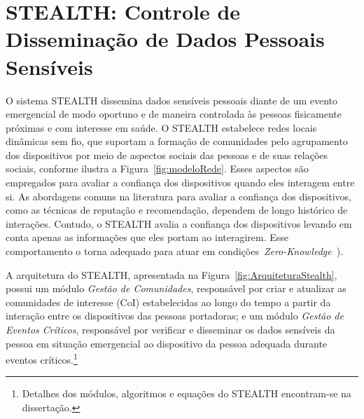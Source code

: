 \documentclass[12pt]{article}
\newcommand{\as}[1]{\textcolor{blue}{{\bf #1}}}
\newcommand{\al}[1]{\textcolor{brown}{{\bf #1}}}
\begin{document}
\vspace{-0.2cm}

\section{STEALTH: Controle de Disseminação de Dados Pessoais Sensíveis}
\label{sec:sistema}

O sistema \mbox{STEALTH} dissemina dados sensíveis pessoais diante de um evento emergencial de modo oportuno e de maneira controlada às pessoas fisicamente próximas e com interesse em saúde. 
O \mbox{STEALTH}
estabelece redes locais dinâmicas sem fio, que suportam a formação de comunidades pelo agrupamento dos dispositivos por meio de aspectos sociais das pessoas e de suas relações sociais,
conforme
ilustra a Figura~\ref{fig:modeloRede}. Esses aspectos são empregados para avaliar a confiança dos dispositivos
quando
eles interagem entre si. As abordagens 
comuns na literatura para avaliar a confiança dos dispositivos, como as técnicas de reputação e recomendação, dependem de longo histórico de interações. 
Contudo,
o \mbox{STEALTH}
avalia a confiança dos dispositivos
levando em conta
apenas
as informações que
eles
portam
ao interagirem.
Esse comportamento o torna adequado para atuar em condições~\textit{Zero-Knowledge}~\cite{kim2015hcs}).







A arquitetura do \mbox{STEALTH}, apresentada na Figura~\ref{fig:ArquiteturaStealth}, possui um módulo
{\it Gestão de Comunidades}, responsável por criar e atualizar as comunidades de interesse (CoI) estabelecidas ao longo do tempo a partir da interação entre os dispositivos das pessoas portadoras; e um módulo {\it Gestão de Eventos Críticos}, responsável por verificar e disseminar os dados sensíveis da pessoa em situação emergencial ao dispositivo da pessoa adequada
durante
eventos críticos.\footnote{Detalhes dos módulos, algoritmos e equações do  \mbox{STEALTH} encontram-se na dissertação.}
\end{document}
